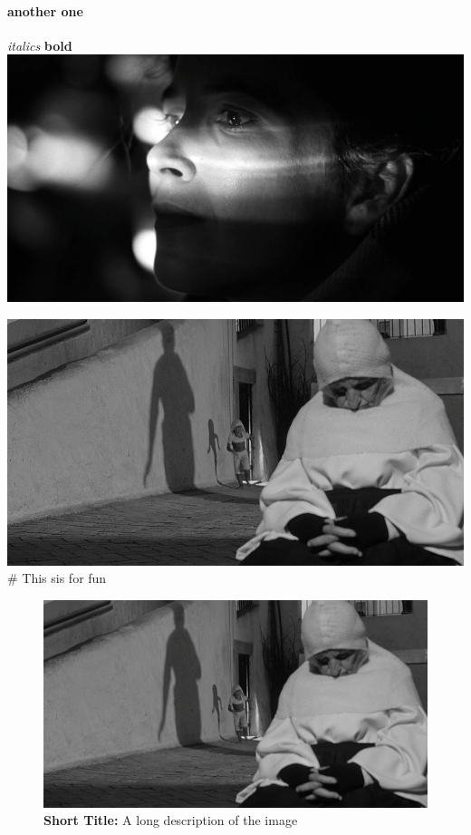 \documentclass[
  12pt,
]{book}
\begin{document}
\hypertarget{another-one}{%
\paragraph{another one}\label{another-one}}

\emph{italics} \textbf{bold} \includegraphics{0314b786c05d34aa190fcc8bf3c6696c.png}

\includegraphics{fd4fef9a20383db8ff25d8806505b409.png} \# This sis for fun

\begin{figure}[ht]

\centering

\includegraphics[width=\linewidth]{fd4fef9a20383db8ff25d8806505b409.png}

\caption[Short Title]{\textbf{Short Title:} A long description of the image}

\label{fig:foo}

\end{figure}
\end{document}
